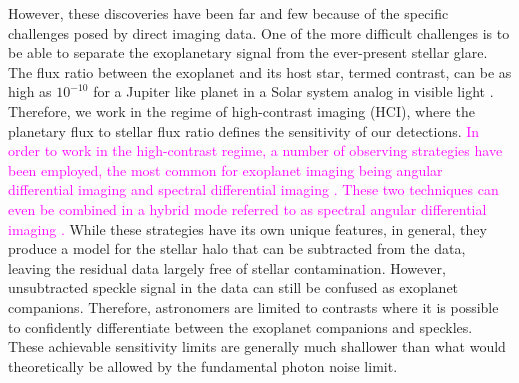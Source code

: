 \documentclass[referee]{aa} %
\newcommand{\newchange}[1]{\textcolor{magenta}{#1}}
\begin{document}
However, these discoveries have been far and few because of the specific challenges posed by direct imaging data.
One of the more difficult challenges is to be able to separate the exoplanetary signal from the ever-present stellar glare.
The flux ratio between the exoplanet and its host star, termed contrast, can be as high as $10^{-10}$ for a Jupiter like planet in a Solar system analog in visible light \citep[e.g.,][]{2023Galicher}.
Therefore, we work in the regime of high-contrast imaging (HCI), where the planetary flux to stellar flux ratio defines the sensitivity of our detections.
\newchange{In order to work in the high-contrast regime, a number of observing strategies have been employed, the most common for exoplanet imaging being angular differential imaging \citep[ADI, ][]{Liu2004,2006MaroisADI} and spectral differential imaging \citep[SDI, ][]{2002SparksSDI}. These two techniques can even be combined in a hybrid mode referred to as spectral angular differential imaging \citep[SADI, e.g.,][]{2019ChristiaensPDS70}.}
While these strategies have its own unique features, in general, they produce a model for the stellar halo that can be subtracted from the data, leaving the residual data largely free of stellar contamination.
However, unsubtracted speckle signal in the data can still be confused as exoplanet companions.
Therefore, astronomers are limited to contrasts where it is possible to confidently differentiate between the exoplanet companions and speckles. These achievable sensitivity limits are generally much shallower than what would theoretically be allowed by the fundamental photon noise limit.
\end{document}
